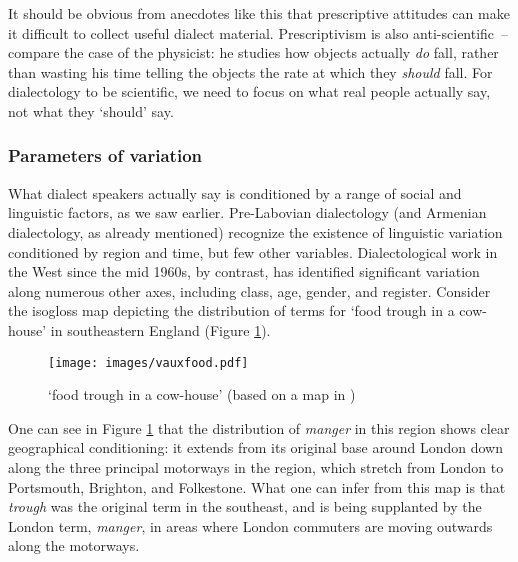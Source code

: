 \documentclass[output=paper]{langscibook}
\begin{document}
It should be obvious from anecdotes like this that prescriptive attitudes can make it difficult to collect useful dialect material. Prescriptivism is also anti\hyp scientific~– compare the case of the physicist: he studies how objects actually \textit{do} fall, rather than wasting his time telling the objects the rate at which they \textit{should} fall. For dialectology to be scientific, we need to focus on what real people actually say, not what they `should' say.

\subsubsection{Parameters of variation}\label{sec:vaux:theory:sync:param}

What dialect speakers actually say is conditioned by a range of social and linguistic factors, as we saw earlier. Pre-Labovian dialectology (and Armenian dialectology, as already mentioned) recognize the existence of linguistic variation conditioned by region and time, but few other variables. Dialectological work in the West since the mid 1960s, by contrast, has identified significant variation along numerous other axes, including class, age, gender, and register. Consider the  isogloss map depicting the distribution of terms for `food trough in a cow-house' in southeastern England (Figure \ref{fig:vaux:food}). 
 
\begin{figure}
    \caption{`food trough in a cow-house' (based on a map in \citealt{Crystal-1995-CambridgeencyclopediaEnglishlanguage})}
    \label{fig:vaux:food}
\texttt{[image: images/vauxfood.pdf]}
\end{figure} 

One can see in Figure \ref{fig:vaux:food} that the distribution of \textit{manger} in this region shows clear geographical conditioning: it extends from its original base around London down along the three principal motorways in the region, which stretch from London to Portsmouth, Brighton, and Folkestone. What one can infer from this map is that \textit{trough} was the original term in the southeast, and is being supplanted by the London term, \textit{manger}, in areas where London commuters are moving outwards along the motorways.
\end{document}
